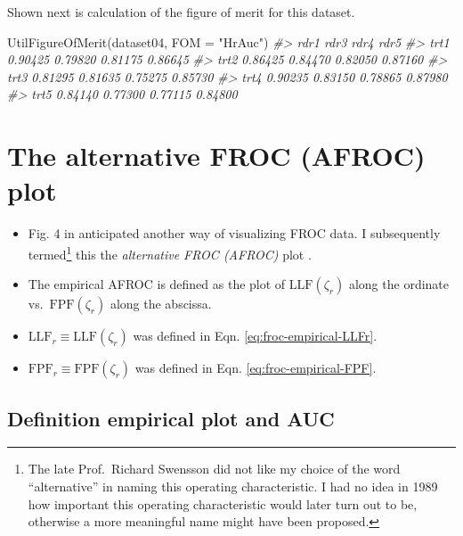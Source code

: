 \documentclass[
]{book}
\newenvironment{Shaded}{\begin{snugshade}}{\end{snugshade}}
\newcommand{\AttributeTok}[1]{\textcolor[rgb]{0.77,0.63,0.00}{#1}}
\newcommand{\CommentTok}[1]{\textcolor[rgb]{0.56,0.35,0.01}{\textit{#1}}}
\newcommand{\FunctionTok}[1]{\textcolor[rgb]{0.00,0.00,0.00}{#1}}
\newcommand{\NormalTok}[1]{#1}
\newcommand{\StringTok}[1]{\textcolor[rgb]{0.31,0.60,0.02}{#1}}
\providecommand{\tightlist}{%
  \setlength{\itemsep}{0pt}\setlength{\parskip}{0pt}}
\begin{document}
Shown next is calculation of the figure of merit for this dataset.

\begin{Shaded}
\begin{Highlighting}[]
\FunctionTok{UtilFigureOfMerit}\NormalTok{(dataset04, }\AttributeTok{FOM =} \StringTok{"HrAuc"}\NormalTok{)}
\CommentTok{\#\textgreater{}         rdr1    rdr3    rdr4    rdr5}
\CommentTok{\#\textgreater{} trt1 0.90425 0.79820 0.81175 0.86645}
\CommentTok{\#\textgreater{} trt2 0.86425 0.84470 0.82050 0.87160}
\CommentTok{\#\textgreater{} trt3 0.81295 0.81635 0.75275 0.85730}
\CommentTok{\#\textgreater{} trt4 0.90235 0.83150 0.78865 0.87980}
\CommentTok{\#\textgreater{} trt5 0.84140 0.77300 0.77115 0.84800}
\end{Highlighting}
\end{Shaded}

\hypertarget{froc-empirical-AFROC}{%
\section{The alternative FROC (AFROC) plot}\label{froc-empirical-AFROC}}

\begin{itemize}
\tightlist
\item
  Fig. 4 in \citep{bunch1977free} anticipated another way of visualizing FROC data. I subsequently termed\footnote{The late Prof.~Richard Swensson did not like my choice of the word ``alternative'' in naming this operating characteristic. I had no idea in 1989 how important this operating characteristic would later turn out to be, otherwise a more meaningful name might have been proposed.} this the \emph{alternative FROC (AFROC)} plot \citep{chakraborty1989maximum}.
\item
  The empirical AFROC is defined as the plot of \(\text{LLF}(\zeta_r)\) along the ordinate vs.~\(\text{FPF}(\zeta_r)\) along the abscissa.
\item
  \(\text{LLF}_r \equiv \text{LLF}(\zeta_r)\) was defined in Eqn. \eqref{eq:froc-empirical-LLFr}.
\item
  \(\text{FPF}_r \equiv \text{FPF}(\zeta_r)\) was defined in Eqn. \eqref{eq:froc-empirical-FPF}.
\end{itemize}

\hypertarget{froc-empirical-definition-empirical-auc-afroc}{%
\subsection{Definition empirical plot and AUC}\label{froc-empirical-definition-empirical-auc-afroc}}
\end{document}
